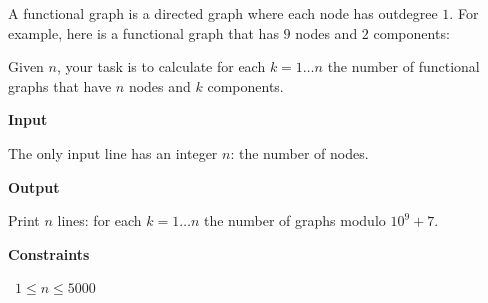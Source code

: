 A functional graph is a directed graph where each node has outdegree $1$. For example, here is a functional graph that has $9$ nodes and $2$ components:

Given $n$, your task is to calculate for each $k=1 \dots n$ the number of functional graphs that have $n$ nodes and $k$ components.

\vspace{0.3cm}\noindent\textbf{Input}

The only input line has an integer $n$: the number of nodes.

\vspace{0.3cm}\noindent\textbf{Output}

Print $n$ lines: for each $k=1 \dots n$ the number of graphs modulo $10^9+7$.

\vspace{0.3cm}\noindent\textbf{Constraints}

\textbullet\ $1 \le n \le 5000$